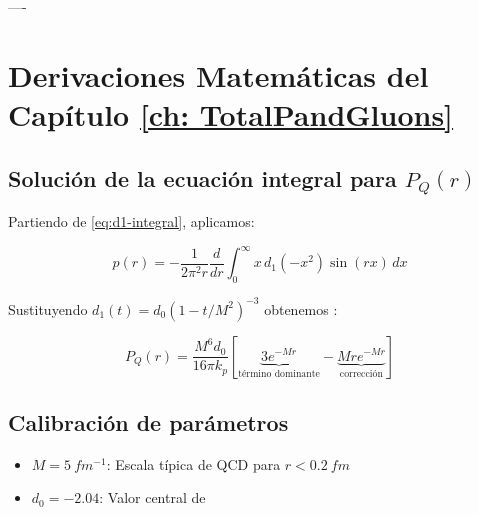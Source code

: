 

----

\section{Derivaciones Matemáticas del Capítulo \ref{ch: TotalPandGluons}} %

\subsection{Solución de la ecuación integral para $P_Q(r)$}
Partiendo de \eqref{eq:d1-integral}, aplicamos:

\begin{equation}
p(r) = -\frac{1}{2\pi^2 r}\frac{d}{dr}\int_0^\infty x\,d_1(-x^2)\sin(rx)\,dx
\end{equation}

Sustituyendo $d_1(t) = d_0(1-t/M^2)^{-3}$ obtenemos \cite{Burkert_2018}:

\begin{equation}
P_Q(r) = \frac{M^6 d_0}{16\pi k_p} \left[ \underbrace{3e^{-Mr}}_{\text{término dominante}} - \underbrace{Mr e^{-Mr}}_{\text{corrección}} \right]
\end{equation}

\subsection{Calibración de parámetros}
\begin{itemize}
    \item $M=\qty{5}{fm^{-1}}$: Escala típica de QCD para $r < \qty{0.2}{fm}$
    \item $d_0=-2.04$: Valor central de \cite{Burkert_2018}
\end{itemize}

